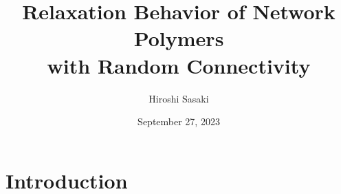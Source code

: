 \documentclass[12pt, dvipdfmx]{beamer}
\title
[Relaxation Behavior of Network Polymers with Random Connectivity]
{Relaxation Behavior of Network Polymers\\ with Random Connectivity}
\author[Toagosei H.Sasaki]{Hiroshi Sasaki}
\institute[Toagosei Co., Ltd.]{Toagosei Co., Ltd.}
\date{September 27, 2023}
\begin{document}
\setlength{\abovedisplayskip}{2pt} %
\setlength{\belowdisplayskip}{2pt} %

\begin{frame}[noframenumbering]\frametitle{}
	\titlepage
\end{frame}

\section{Introduction}
\end{document}
